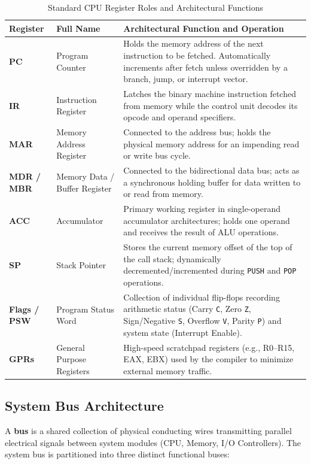 \begin{table}[htbp]
\centering
\small
\caption{Standard CPU Register Roles and Architectural Functions}
\label{tab:cpu_registers}
\begin{tabularx}{\textwidth}{l l X}
\toprule
\textbf{Register} & \textbf{Full Name} & \textbf{Architectural Function and Operation} \\
\midrule
\textbf{PC} & Program Counter & Holds the memory address of the next instruction to be fetched. Automatically increments after fetch unless overridden by a branch, jump, or interrupt vector. \\
\textbf{IR} & Instruction Register & Latches the binary machine instruction fetched from memory while the control unit decodes its opcode and operand specifiers. \\
\textbf{MAR} & Memory Address Register & Connected to the address bus; holds the physical memory address for an impending read or write bus cycle. \\
\textbf{MDR / MBR} & Memory Data / Buffer Register & Connected to the bidirectional data bus; acts as a synchronous holding buffer for data written to or read from memory. \\
\textbf{ACC} & Accumulator & Primary working register in single-operand accumulator architectures; holds one operand and receives the result of ALU operations. \\
\textbf{SP} & Stack Pointer & Stores the current memory offset of the top of the call stack; dynamically decremented/incremented during \texttt{PUSH} and \texttt{POP} operations. \\
\textbf{Flags / PSW} & Program Status Word & Collection of individual flip-flops recording arithmetic status (Carry \texttt{C}, Zero \texttt{Z}, Sign/Negative \texttt{S}, Overflow \texttt{V}, Parity \texttt{P}) and system state (Interrupt Enable). \\
\textbf{GPRs} & General Purpose Registers & High-speed scratchpad registers (e.g., R0--R15, EAX, EBX) used by the compiler to minimize external memory traffic. \\
\bottomrule
\end{tabularx}
\end{table}

\subsection{System Bus Architecture}
A \textbf{bus} is a shared collection of physical conducting wires transmitting parallel electrical signals between system modules (CPU, Memory, I/O Controllers). The system bus is partitioned into three distinct functional buses:

